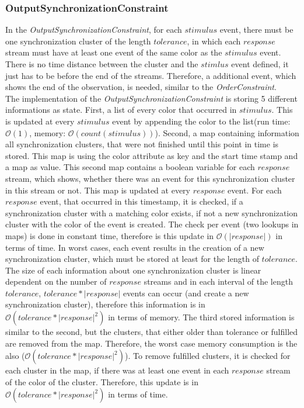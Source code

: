 \subsubsection{OutputSynchronizationConstraint}
	In the \emph{OutputSynchronizationConstraint}, for each $stimulus$ event, there must be one synchronization cluster of the length $tolerance$, in which each $response$ stream must have at least one event of the same color as the $stimulus$ event. There is no time distance between the cluster and the $stimlus$ event defined, it just has to be before the end of the streams. Therefore, a additional event, which shows the end of the observation, is needed, similar to the \emph{OrderConstraint}.\\
	The implementation of the \emph{OutputSynchronizationConstraint} is storing 5 different informations as state. First, a list of every color that occurred in $stimulus$. This is updated at every $stimulus$ event by appending the color to the list(run time: $\mathcal{O}(1)$, memory: $\mathcal{O}(count(stimulus))$). 
	Second, a map containing information all synchronization clusters, that were not finished until this point in time is stored. This map is using the color attribute as key and the start time stamp and a map as value. This second map contains a boolean variable for each $response$ stream, which shows, whether there was an event for this synchronization cluster in this stream or not. This map is updated at every $response$ event. For each $response$ event, that occurred in this timestamp, it is checked, if a synchronization cluster with a matching color exists, if not a new synchronization cluster with the color of the event is created. The check per event (two lookups in maps)  is done in constant time, therefore is this update in $\mathcal{O}(|response|)$ in terms of time. In worst cases, each event results in the creation of a new synchronization cluster, which must be stored at least for the length of $tolerance$. The size of each information about one synchronization cluster is linear dependent on the number of $response$ streams and in each interval of the length $tolerance$, $tolerance*|response|$ events can occur (and create a new synchronization cluster), therefore this information is in $\mathcal{O}(tolerance*|response|^2)$ in terms of memory. The third stored information is similar to the second, but the clusters, that either older than tolerance or fulfilled are removed from the map. Therefore, the worst case memory consumption is the also ($\mathcal{O}(tolerance*|response|^2)$). To remove fulfilled clusters, it is checked for each cluster in the map, if there was at least one event in each $response$ stream of the color of the cluster. Therefore, this update is in $\mathcal{O}(tolerance*|response|^2)$ in terms of time.
